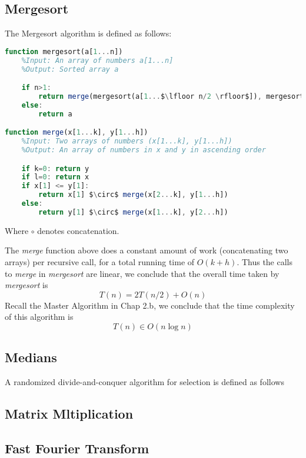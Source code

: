 \subsection{Mergesort}

\begin{definition}[Mergesort]
The Mergesort algorithm is defined as follows:
\begin{lstlisting}[mathescape=true, language=Octave]
function mergesort(a[1...n])
	%Input: An array of numbers a[1...n]
	%Output: Sorted array a

	if n>1:
		return merge(mergesort(a[1...$\lfloor n/2 \rfloor$]), mergesort(a[$\lfloor n/2 \rfloor$+1...n]))
	else:
		return a

function merge(x[1...k], y[1...h])
	%Input: Two arrays of numbers (x[1...k], y[1...h])
	%Output: An array of numbers in x and y in ascending order

	if k=0: return y
	if l=0: return x
	if x[1] <= y[1]:
		return x[1] $\circ$ merge(x[2...k], y[1...h])
	else:
		return y[1] $\circ$ merge(x[1...k], y[2...h])
\end{lstlisting}
Where $\circ$ denotes concatenation.
\end{definition}

The \textit{merge} function above does a constant amount of work (concatenating two arrays) per recursive call, for a total running time of $O(k + h)$. Thus the calls to \textit{merge} in \textit{mergesort} are linear, we conclude that the overall time taken by \textit{mergesort} is
\[
T(n) = 2T(n/2) + O(n)
\]
Recall the Master Algorithm in Chap 2.b, we conclude that the time complexity of this algorithm is
\[
T(n) \in O(n\log n)
\]

\subsection{Medians}

\begin{definition}[selection]
A randomized divide-and-conquer algorithm for selection is defined as follows

\end{definition}

\subsection{Matrix Mltiplication}

\begin{definition}

\end{definition}

\subsection{Fast Fourier Transform}